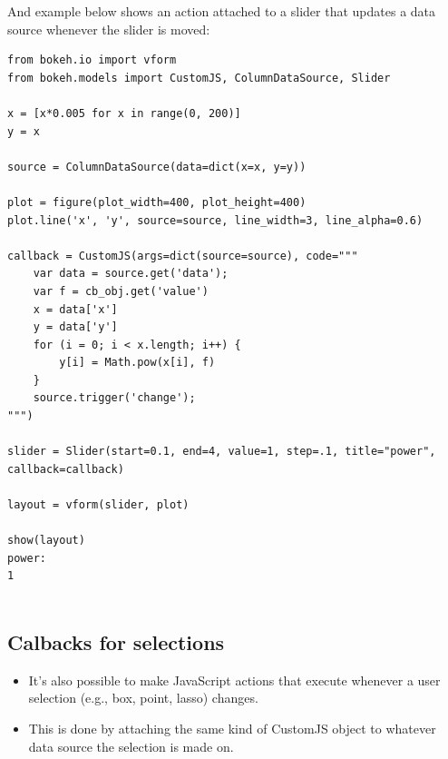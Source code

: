 \documentclass[a4paper,12pt]{article}
\begin{document}
And example below shows an action attached to a slider that updates a data source whenever the slider is moved:
\begin{framed}
	\begin{verbatim}
from bokeh.io import vform
from bokeh.models import CustomJS, ColumnDataSource, Slider

x = [x*0.005 for x in range(0, 200)]
y = x

source = ColumnDataSource(data=dict(x=x, y=y))

plot = figure(plot_width=400, plot_height=400)
plot.line('x', 'y', source=source, line_width=3, line_alpha=0.6)

callback = CustomJS(args=dict(source=source), code="""
    var data = source.get('data');
    var f = cb_obj.get('value')
    x = data['x']
    y = data['y']
    for (i = 0; i < x.length; i++) {
        y[i] = Math.pow(x[i], f)
    }
    source.trigger('change');
""")

slider = Slider(start=0.1, end=4, value=1, step=.1, title="power", callback=callback)

layout = vform(slider, plot)

show(layout)
power:  
1
	
\end{verbatim}
\end{framed}
 	

\newpage
\subsection*{Calbacks for selections}
\begin{itemize}
\item It's also possible to make JavaScript actions that execute whenever a user selection (e.g., box, point, lasso) changes. 
\item This is done by attaching the same kind of CustomJS object to whatever data source the selection is made on.
\end{itemize}
\end{document}
